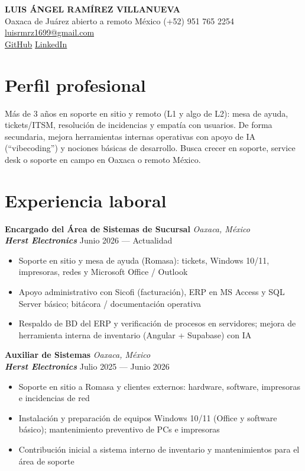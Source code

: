 \documentclass[10pt,letterpaper]{article}
\newcommand{\entry}[4]{
  \begin{minipage}[t]{\linewidth}
    \textbf{#1} \hfill \textit{#2} \\
    \textbf{\textit{#3}} \hfill #4
  \end{minipage}
}
\begin{document}

\begin{center}
	{\huge\bfseries LUIS ÁNGEL RAMÍREZ VILLANUEVA}\\[3pt]
	Oaxaca de Juárez \textbullet{} abierto a remoto México \textbullet{} (+52) 951 765 2254 \textbullet{}
	\href{mailto:luisrmrz1699@gmail.com}{luisrmrz1699@gmail.com}\\[3pt]
	\href{https://github.com/luisrmrz16}{GitHub} \textbullet{}
	\href{https://www.linkedin.com/in/luisrmrz16/}{LinkedIn}
\end{center}

\section*{Perfil profesional}

Más de 3 años en soporte en sitio y remoto (L1 y algo de L2): mesa de ayuda, tickets/ITSM, resolución de incidencias y empatía con usuarios. De forma secundaria, mejora herramientas internas operativas con apoyo de IA (``vibecoding'') y nociones básicas de desarrollo. Busca crecer en soporte, service desk o soporte en campo en Oaxaca o remoto México.

\section*{Experiencia laboral}

\entry
{Encargado del Área de Sistemas de Sucursal}
{Oaxaca, México}
{Herst Electronics}
{Junio 2026 --- Actualidad}
\begin{itemize}
	\item Soporte en sitio y mesa de ayuda (Romasa): tickets, Windows 10/11, impresoras, redes y Microsoft Office / Outlook
	\item Apoyo administrativo con Sicofi (facturación), ERP en MS Access y SQL Server básico; bitácora / documentación operativa
	\item Respaldo de BD del ERP y verificación de procesos en servidores; mejora de herramienta interna de inventario (Angular + Supabase) con IA
\end{itemize}

\entry
{Auxiliar de Sistemas}
{Oaxaca, México}
{Herst Electronics}
{Julio 2025 --- Junio 2026}
\begin{itemize}
	\item Soporte en sitio a Romasa y clientes externos: hardware, software, impresoras e incidencias de red
	\item Instalación y preparación de equipos Windows 10/11 (Office y software básico); mantenimiento preventivo de PCs e impresoras
	\item Contribución inicial a sistema interno de inventario y mantenimientos para el área de soporte
\end{itemize}
\end{document}
